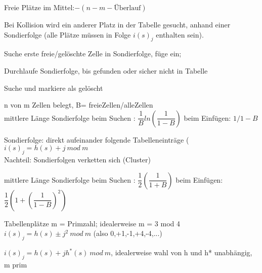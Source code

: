 Freie Plätze im Mittel:$ -(n - m - \text{Überlauf})   $


Bei Kollision wird ein anderer Platz in der Tabelle gesucht, anhand einer Sondierfolge (alle Plätze müssen in Folge $i(s)_j$ enthalten sein).

Suche erste freie/gelöschte Zelle in Sondierfolge, füge ein;

Durchlaufe Sondierfolge, bis gefunden oder sicher nicht in Tabelle 

 Suche und markiere als gelöscht

n von m Zellen belegt, B= freieZellen/alleZellen \\
mittlere Länge Sondierfolge beim Suchen : $\dfrac{1}{B}ln\left(\dfrac{1}{1-B}\right)$
beim Einfügen: $1/1-B$

Sondierfolge: direkt aufeinander folgende Tabelleneinträge ($i(s)_j=h(s)+j~mod~m$\\
Nachteil: Sondierfolgen verketten sich (Cluster)

mittlere Länge Sondierfolge beim Suchen : $\dfrac{1}{2}\left(\dfrac{1}{1+B}\right)$
beim Einfügen:  $\dfrac{1}{2}\left(1+\left(\dfrac{1}{1-B}\right)^2\right)$

Tabellenplätze m = Primzahl; idealerweise m = 3 mod 4 \\
$i(s)_j = h(s) \pm j^2~mod~m$ (also 0,+1,-1,+4,-4,...) 

$i(s)_j = h(s) + jh^*(s)~ mod~ m$, idealerweise wahl von h und h* unabhängig, m prim

